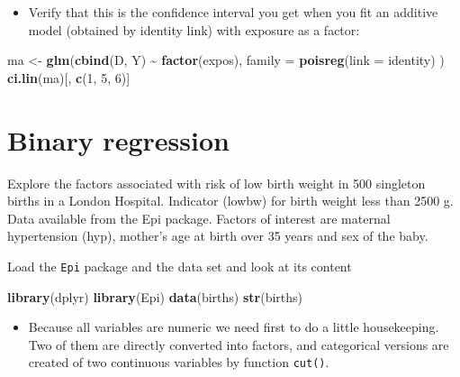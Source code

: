 \documentclass[
]{book}
\newenvironment{Shaded}{\begin{snugshade}}{\end{snugshade}}
\newcommand{\AttributeTok}[1]{\textcolor[rgb]{0.13,0.29,0.53}{#1}}
\newcommand{\DecValTok}[1]{\textcolor[rgb]{0.00,0.00,0.81}{#1}}
\newcommand{\FunctionTok}[1]{\textcolor[rgb]{0.13,0.29,0.53}{\textbf{#1}}}
\newcommand{\NormalTok}[1]{#1}
\newcommand{\OtherTok}[1]{\textcolor[rgb]{0.56,0.35,0.01}{#1}}
\newcommand{\SpecialCharTok}[1]{\textcolor[rgb]{0.81,0.36,0.00}{\textbf{#1}}}
\providecommand{\tightlist}{%
  \setlength{\itemsep}{0pt}\setlength{\parskip}{0pt}}
\begin{document}
\begin{itemize}
\tightlist
\item
  Verify that this is the confidence interval you get when you fit
  an additive model (obtained by identity link) with exposure as a factor:
\end{itemize}

\begin{Shaded}
\begin{Highlighting}[]
\NormalTok{ma }\OtherTok{\textless{}{-}} \FunctionTok{glm}\NormalTok{(}\FunctionTok{cbind}\NormalTok{(D, Y) }\SpecialCharTok{\textasciitilde{}} \FunctionTok{factor}\NormalTok{(expos),}
  \AttributeTok{family =} \FunctionTok{poisreg}\NormalTok{(}\AttributeTok{link =}\NormalTok{ identity)}
\NormalTok{)}
\FunctionTok{ci.lin}\NormalTok{(ma)[, }\FunctionTok{c}\NormalTok{(}\DecValTok{1}\NormalTok{, }\DecValTok{5}\NormalTok{, }\DecValTok{6}\NormalTok{)]}
\end{Highlighting}
\end{Shaded}

\section{Binary regression}\label{binary-regression}

Explore the factors associated with risk of low birth weight
in 500 singleton births in a London Hospital. Indicator (lowbw) for birth weight less than 2500 g. Data available from the Epi package. Factors of interest are
maternal hypertension (hyp), mother's age at birth over 35 years and sex of the baby.

Load the \texttt{Epi} package and the data set and look at its content

\begin{Shaded}
\begin{Highlighting}[]
\FunctionTok{library}\NormalTok{(dplyr)}
\FunctionTok{library}\NormalTok{(Epi)}
\FunctionTok{data}\NormalTok{(births)}
\FunctionTok{str}\NormalTok{(births)}
\end{Highlighting}
\end{Shaded}

\begin{itemize}
\tightlist
\item
  Because all variables are numeric we need first to do a little housekeeping.
  Two of them are directly converted into factors,
  and categorical versions are created of two continuous variables by function \texttt{cut()}.
\end{itemize}
\end{document}
